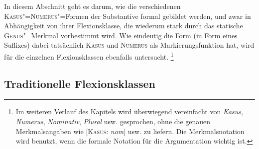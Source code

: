 \label{sec:subst}

In diesem Abschnitt geht es darum, wie die verschiedenen \textsc{Kasus}"=\textsc{Numerus}"=Formen der Substantive formal gebildet werden, und zwar in Abhängigkeit von ihrer Flexionsklasse, die wiederum stark durch das statische \textsc{Genus}"=Merkmal vorbestimmt wird.
Wie eindeutig die Form (\zB in Form eines Suffixes) dabei tatsächlich \textsc{Kasus} und \textsc{Numerus} als Markierungsfunktion hat, wird für die einzelnen Flexionsklassen ebenfalls untersucht.%
\footnote{Im weiteren Verlauf des Kapitels wird überwiegend vereinfacht von \textit{Kasus}, \textit{Numerus}, \textit{Nominativ}, \textit{Plural} usw. gesprochen, ohne die genauen Merkmalsangaben wie [\textsc{Kasus}: \textit{nom}] usw. zu liefern.
Die Merkmalsnotation wird benutzt, wenn die formale Notation für die Argumentation wichtig ist.}

\subsection{Traditionelle Flexionsklassen}

\label{sec:nominaflexionsklassen}
\label{Substantiv!Flexion}

